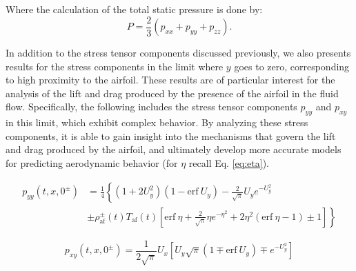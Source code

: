 

\restoregeometry
Where the calculation of the total static pressure is done by\cite{kogan1969rarefied}:
\begin{equation}
    P
    =
    \frac{2}{3}\left( p_{xx} + p_{yy} + p_{zz}\right)
    .
\end{equation}

In addition to the stress tensor components discussed previously, we also presents results for the stress components in the limit where $y$ goes to zero, corresponding to high proximity to the airfoil. These results are of particular interest for the analysis of the lift and drag produced by the presence of the airfoil in the fluid flow. Specifically, the following includes the stress tensor components $p_{yy}$ and $p_{xy}$ in this limit, which exhibit complex behavior. By analyzing these stress components, it is able to gain insight into the mechanisms that govern the lift and drag produced by the airfoil, and ultimately develop more accurate models for predicting aerodynamic behavior (for $\eta$ recall Eq. \ref{eq:eta}).

\begin{equation}
\begin{aligned}
p_{yy}\left( t,x,0^{\pm }\right) & =\frac{1}{4}\left\{\left( 1 + 2U_{y}^{2}\right)( 1-\mathrm{erf} \ U_{y}) -\frac{2}{\sqrt{\pi }} U_{y} e^{- U_{y}^{2}}\right. \\
 & \left. \pm \rho _{\text{af}}^{\pm }( t) T_{\text{af}}( t)\left[\mathrm{erf} \ \eta +\frac{2}{\sqrt{\pi }} \eta e^{-\eta ^{2}} +2\eta ^{2}(\mathrm{erf} \ \eta -1) \pm 1\right]\right\}
\end{aligned}
\end{equation}

\begin{equation}
p_{xy}\left( t,x,0^{\pm }\right) =\frac{1}{2\sqrt{\pi }} U_{x}\left[ U_{y}\sqrt{\pi }( 1\mp \mathrm{erf} \ U_{y}) \mp e^{- U_{y}^{2}}\right]
\end{equation}

\newpage
